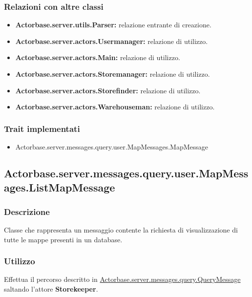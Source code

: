 \documentclass[a4paper]{article}
\begin{document}
			\subsubsection{Relazioni con altre classi}
				\begin{itemize}
					\item \textbf{Actorbase.server.utils.Parser:} relazione entrante di creazione.
					\item \textbf{Actorbase.server.actors.Usermanager:} relazione di utilizzo.
					\item \textbf{Actorbase.server.actors.Main:} relazione di utilizzo.
					\item \textbf{Actorbase.server.actors.Storemanager:} relazione di utilizzo.
					\item \textbf{Actorbase.server.actors.Storefinder:} relazione di utilizzo.
					\item \textbf{Actorbase.server.actors.Warehouseman:} relazione di utilizzo.
				\end{itemize}
			\subsubsection{Trait implementati}
				\begin{itemize}
					\item Actorbase.server.messages.query.user.MapMessages.MapMessage
				\end{itemize}
				
		\subsection{Actorbase.server.messages.query.user.MapMessages.ListMapMessage}
			\subsubsection{Descrizione}
				Classe che rappresenta un messaggio contente la richiesta di visualizzazione di tutte le mappe presenti in un database.
				
			\subsubsection{Utilizzo}
				Effettua il percorso descritto in \hyperref[QueryMessage]{Actorbase.server.messages.query.QueryMessage} saltando l'attore \textbf{Storekeeper}.
				
\end{document}
